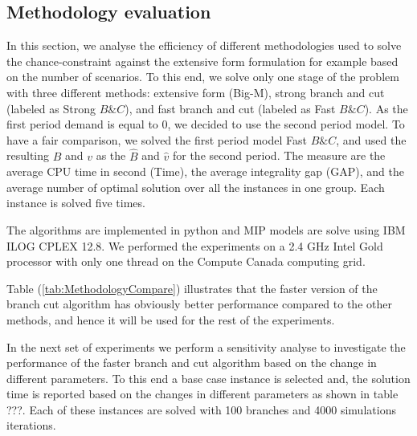 \documentclass[10pt]{article}
\newcommand{\Bi}{B} %
\newcommand{\Vi}{v} %
\begin{document}
\subsection{Methodology evaluation}
In this section, we analyse the efficiency of different methodologies used to solve the chance-constraint against the extensive form formulation for example based on the number of scenarios. To this end, we solve only one stage of the problem with three different methods: extensive form (Big-M), strong branch and cut (labeled as Strong $B\& C$), and fast branch and cut (labeled as Fast $B\&C$). As the first period demand is equal to 0, we decided to use the second period model. To have a fair comparison, we solved the first period model Fast $B\&C$, and used the resulting ${\Bi}$ and ${\Vi}$ as the $\hat{\Bi}$ and $\hat{\Vi}$ for the second period. The measure are the average CPU time in second (Time), the average integrality gap (GAP), and the average number of optimal solution over all the instances in one group. Each instance is solved five times.

The algorithms are implemented in python and MIP models are solve using IBM ILOG CPLEX 12.8. We performed the experiments on a 2.4 GHz Intel Gold processor with only one thread on the Compute Canada computing grid.

Table (\ref{tab:MethodologyCompare}) illustrates that the faster version of the branch cut algorithm has obviously better performance compared to the other methods, and hence it will be used for the rest of the experiments.

In the next set of experiments we perform a sensitivity analyse to investigate the performance of the faster branch and cut algorithm based on the change in different parameters. To this end a base case instance is selected and, the solution time is reported based on the changes in different parameters as shown in table ???. 
Each of these instances are solved with 100 branches and 4000 simulations iterations. 
\end{document}
